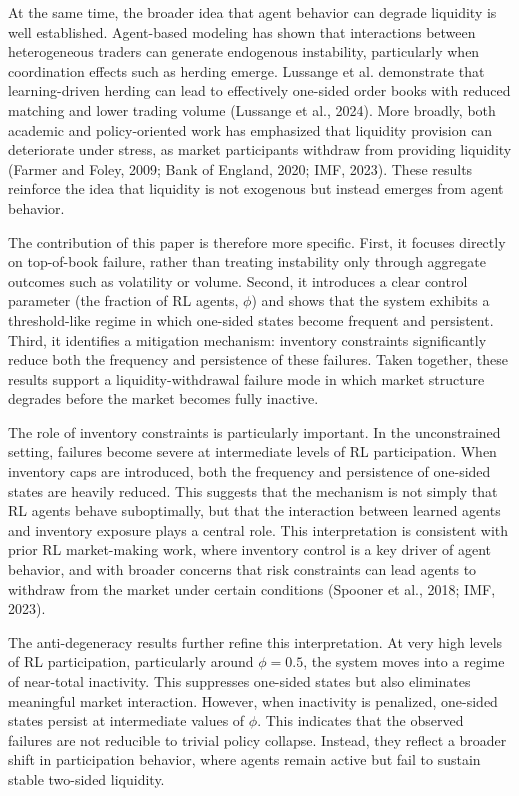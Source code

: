 \documentclass[11pt]{article}
\begin{document}
At the same time, the broader idea that agent behavior can degrade liquidity is well established. Agent-based modeling has shown that interactions between heterogeneous traders can generate endogenous instability, particularly when coordination effects such as herding emerge. Lussange et al. demonstrate that learning-driven herding can lead to effectively one-sided order books with reduced matching and lower trading volume (Lussange et al., 2024). More broadly, both academic and policy-oriented work has emphasized that liquidity provision can deteriorate under stress, as market participants withdraw from providing liquidity (Farmer and Foley, 2009; Bank of England, 2020; IMF, 2023). These results reinforce the idea that liquidity is not exogenous but instead emerges from agent behavior.

The contribution of this paper is therefore more specific. First, it focuses directly on top-of-book failure, rather than treating instability only through aggregate outcomes such as volatility or volume. Second, it introduces a clear control parameter (the fraction of RL agents, $\phi$) and shows that the system exhibits a threshold-like regime in which one-sided states become frequent and persistent. Third, it identifies a mitigation mechanism: inventory constraints significantly reduce both the frequency and persistence of these failures. Taken together, these results support a liquidity-withdrawal failure mode in which market structure degrades before the market becomes fully inactive.

The role of inventory constraints is particularly important. In the unconstrained setting, failures become severe at intermediate levels of RL participation. When inventory caps are introduced, both the frequency and persistence of one-sided states are heavily reduced. This suggests that the mechanism is not simply that RL agents behave suboptimally, but that the interaction between learned agents and inventory exposure plays a central role. This interpretation is consistent with prior RL market-making work, where inventory control is a key driver of agent behavior, and with broader concerns that risk constraints can lead agents to withdraw from the market under certain conditions (Spooner et al., 2018; IMF, 2023).

The anti-degeneracy results further refine this interpretation. At very high levels of RL participation, particularly around $\phi = 0.5$, the system moves into a regime of near-total inactivity. This suppresses one-sided states but also eliminates meaningful market interaction. However, when inactivity is penalized, one-sided states persist at intermediate values of $\phi$. This indicates that the observed failures are not reducible to trivial policy collapse. Instead, they reflect a broader shift in participation behavior, where agents remain active but fail to sustain stable two-sided liquidity.
\end{document}
